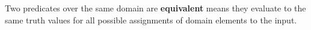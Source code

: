 
Two predicates over the same domain are {\bf equivalent} means they evaluate to
the same truth values for all possible assignments of domain elements to the
input.